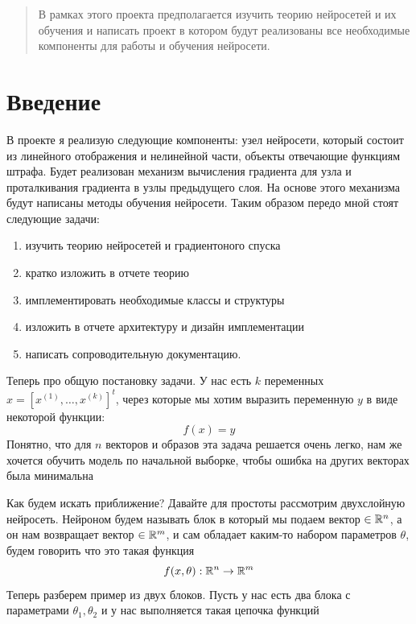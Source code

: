 \documentclass{article}
\begin{document}
\makeTitlePage

\tableofcontents


\newpage

\begin{abstract}
В рамках этого проекта предполагается изучить теорию нейросетей и их обучения и написать проект в котором будут реализованы все необходимые компоненты для работы и обучения нейросети.
\end{abstract}


\section{Введение}

В проекте я реализую следующие компоненты: узел нейросети, который состоит из линейного отображения и нелинейной части, объекты отвечающие функциям штрафа. Будет реализован механизм вычисления градиента для узла и проталкивания градиента в узлы предыдущего слоя. На основе этого механизма будут написаны методы обучения нейросети. Таким образом передо мной стоят следующие задачи:
\begin{enumerate}
    \item изучить теорию нейросетей и градиентоного спуска
    \item кратко изложить в отчете теорию
    \item имплементировать необходимые классы и структуры
    \item изложить в отчете архитектуру и дизайн имплементации
    \item написать сопроводительную документацию.
\end{enumerate}


Теперь про общую постановку задачи. У нас есть $k$ переменных $x = [x^{(1)}, \dots, x^{(k)}]^t$, через которые мы хотим выразить переменную $y$ в виде некоторой функции:
$$
f(x) = y
$$
Понятно, что для $n$ векторов и образов эта задача решается очень легко, нам же хочется обучить модель по начальной выборке, чтобы ошибка на других векторах была минимальна

Как будем искать приближение? Давайте для простоты рассмотрим двухслойную нейросеть. Нейроном будем называть блок в который мы подаем вектор $\in \mathbb{R}^n$, а он нам возвращает вектор $\in \mathbb{R}^m$, и сам обладает каким-то набором параметров $\theta$, будем говорить что это такая функция
$$
f(x, \theta): \mathbb{R}^n \rightarrow \mathbb{R}^m
$$
Теперь разберем пример из двух блоков. Пусть у нас есть два блока с параметрами $\theta_1, \theta_2$ и у нас выполняется такая цепочка функций
\end{document}
